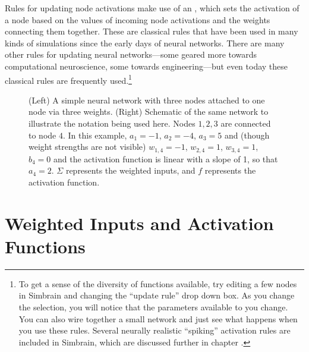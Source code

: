 Rules for updating node activations make use of an , which sets the activation of a node based on the values of incoming node activations and the weights connecting them together. These are classical rules that have been used in many kinds of simulations since the early days of neural networks. There are many other rules for updating neural networks---some geared more towards computational neuroscience, some towards engineering---but even today these classical rules are frequently used.\footnote{To get a sense of the diversity of functions available, try editing a few nodes in Simbrain and changing the
``update rule'' drop down box. As you change the selection, you will notice that
the parameters available to you change. You can also wire together a small
network and just see what happens when you use these rules. Several neurally realistic ``spiking'' activation rules are included in Simbrain, which are discussed further in chapter .}

\begin{figure}[h]
\centering
{}
\hspace*{.4in}
\caption[Left: Simbrain screenshot; Right: Jeff Yoshimi.]{(Left) A simple neural network with three nodes attached to one node via three weights. (Right) Schematic of the same network to illustrate the notation being used here. Nodes $1, 2, 3$ are connected to node $4$. In this example, $a_1 = -1$, $a_2 = -4$, $a_3=5$ and (though weight strengths are not visible) $w_{1,4} = -1$, $w_{2,4} = 1$, $w_{3,4} = 1$, $b_4 = 0$ and the activation function is linear with a slope of 1, so that $a_4 = 2$. $\Sigma$ represents the weighted inputs, and $f$ represents the activation function.}
\label{F:simplenet1}
\end{figure}

\section{Weighted Inputs and Activation Functions}

